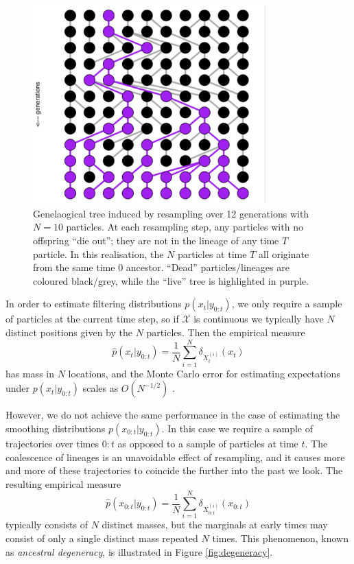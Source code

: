 \documentclass[fleqn]{article}
\theoremstyle{definition}
\begin{document}
\begin{figure}
\centering
\includegraphics[width=0.8\textwidth]{eg_WF.pdf}
\caption{Genelaogical tree induced by resampling over 12 generations with $N=10$ particles. At each resampling step, any particles with no offspring ``die out''; they are not in the lineage of any time $T$ particle. In this realisation, the $N$ particles at time $T$ all originate from the same time $0$ ancestor. ``Dead'' particles/lineages are coloured black/grey, while the ``live'' tree is highlighted in purple.}
\label{fig:WF_tree}
\end{figure}

In order to estimate filtering distributions $p(x_t | y_{0:t})$, we only require a sample of particles at the current time step, so if $\mathcal{X}$ is continuous we typically have $N$ distinct positions given by the $N$ particles. Then the empirical measure
\begin{equation*}
\hat{p}(x_{t}|y_{0:t}) = \frac{1}{N} \sum_{i=1}^N \delta_{X_{t}^{(i)}} (x_{t})
\end{equation*}
has mass in $N$ locations, and the Monte Carlo error for estimating expectations under $p(x_t | y_{0:t})$ scales as $O(N^{-1/2})$ \citep{doucet2009}.

However, we do not achieve the same performance in the case of estimating the  smoothing distributions $p(x_{0:t} | y_{0:t})$. In this case we require a sample of trajectories over times $0:t$ as opposed to a sample of particles at time $t$.
The coalescence of lineages is an unavoidable effect of resampling, and it causes more and more of these trajectories to coincide the further into the past we look.
The resulting empirical measure
\begin{equation*}
\hat{p}(x_{0:t}|y_{0:t}) = \frac{1}{N} \sum_{i=1}^N \delta_{X_{0:t}^{(i)}} (x_{0:t})
\end{equation*}
typically consists of $N$ distinct masses, but the marginals at early times may consist of only a single distinct mass repeated $N$ times.
This phenomenon, known as \emph{ancestral degeneracy}, is illustrated in Figure \ref{fig:degeneracy}.
\end{document}
